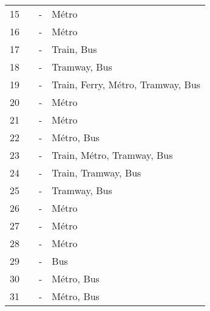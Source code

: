 \begin{longtable}{p{0.5cm}p{5.5cm}p{3cm}p{4cm}}
    \small{15} & \small{\textcite{gu_measuring_2019}}\index{Gu, Tianqi|pagebf} & \small{-} & \small{Métro}\\
    \small{16} & \small{\textcite{hua_transfer_2022}}\index{Hua, Mingzhuang|pagebf} & \small{-} & \small{Métro}\\
    \small{17} & \small{\textcite{iacobucci_transit_2017}}\index{Iacobucci, Joe|pagebf} & \small{-} & \small{Train, Bus}\\
    \small{18} & \small{\textcite{itf_integrating_2018}}\index{International Transport Forum|pagebf} & \small{-} & \small{Tramway, Bus}\\
    \small{19} & \small{\textcite{jappinen_modelling_2013}}\index{Jäppinen, Sakari|pagebf} & \small{-} & \small{Train, Ferry, Métro, Tramway, Bus}\\
    \small{20} & \small{\textcite{ji_public_2017}}\index{Ji, Yanjie|pagebf} & \small{-} & \small{Métro}\\
    \small{21} & \small{\textcite{ji_exploring_2018}}\index{Ji, Yanjie|pagebf} & \small{-} & \small{Métro}\\
    \small{22} & \small{\textcite{kim_analysis_2021}}\index{Kim, Minjun|pagebf} & \small{-} & \small{Métro, Bus}\\
    \small{23} & \small{\textcite{kong_deciphering_2020}}\index{Kong, Hui|pagebf} & \small{-} & \small{Train, Métro, Tramway, Bus}\\
    \small{24} & \small{\textcite{leth_competition_2017}}\index{Leth, Ulrich|pagebf} & \small{-} & \small{Train, Tramway, Bus}\\
    \small{25} & \small{\textcite{li_investigating_2022}}\index{Li, Xiaofeng|pagebf} & \small{-} & \small{Tramway, Bus}\\
    \small{26} & \small{\textcite{lin_built_2018}}\index{Lin, Jen-Jia|pagebf} & \small{-} & \small{Métro}\\
    \small{27} & \small{\textcite{liu_optimizing_2019}}\index{Liu, Lumei|pagebf} & \small{-} & \small{Métro}\\
    \small{28} & \small{\textcite{liu_understanding_2020}}\index{Liu, Yang|pagebf} & \small{-} & \small{Métro}\\
    \small{29} & \small{\textcite{liu_simultaneous_2015}}\index{Liu, Yang|pagebf} & \small{-} & \small{Bus}\\
    \small{30} & \small{\textcite{liu_solving_2012}}\index{Liu, Zhili|pagebf} & \small{-} & \small{Métro, Bus}\\
    \small{31} & \small{\textcite{lu_improving_2018}}\index{Lu, Miaojia|pagebf} & \small{-} & \small{Métro, Bus}\\

\end{longtable}
